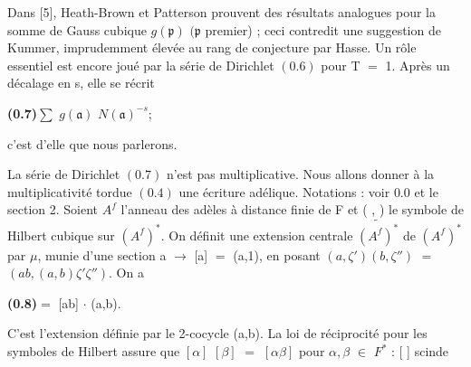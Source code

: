 \documentclass[10pt,a4paper]{article}
\begin{document}
\par Dans [5], Heath-Brown et Patterson prouvent des résultats analogues pour la somme de Gauss cubique $g(\mathfrak{p})$ $(\mathfrak{p}$ premier) ; ceci contredit une suggestion de Kummer, imprudemment élevée au rang de conjecture par Hasse. Un rôle essentiel est encore joué par la série de Dirichlet $(0.6)$ pour T $=$ 1. Après un décalage en s, elle se récrit\par
\par\noindent\textbf{(0.7)}\quad $\sum{}$ $g(\mathfrak{a})$ $N(\mathfrak{a})^{-s}$;\par
\par c'est d'elle que nous parlerons.\par
\par La série de Dirichlet $(0.7)$ n'est pas multiplicative. Nous allons donner à la multiplicativité tordue $(0.4)$ une écriture adélique. Notations : voir $0.0$ et le section 2. Soient $A^f$ l'anneau des adèles à distance finie de F et ( , ) le symbole de Hilbert cubique sur $(A^f)^*$. On définit une extension centrale $\widetilde{(A^f)^*}$ de $(A^f)^*$ par $\mu{}$, munie d'une section a $\to{}$ [a] $=$ (a,1), en posant $(a,\zeta{}')(b,\zeta{}'')$ $=$ $(ab,(a,b)\zeta{}'\zeta{}'')$. On a\par
\par\noindent\textbf{(0.8)}\quad [a] [b] $=$ [ab] $\cdot{}$ (a,b).\par
\par C'est l'extension définie par le 2-cocycle (a,b). La loi de réciprocité pour les symboles de Hilbert assure que $[\alpha{}]$ $[\beta{}]$ $=$ $[\alpha{}\beta{}]$ pour $\alpha{},\beta{}$ $\in{}$ $F^*$ : [ ] scinde\par
\end{document}
